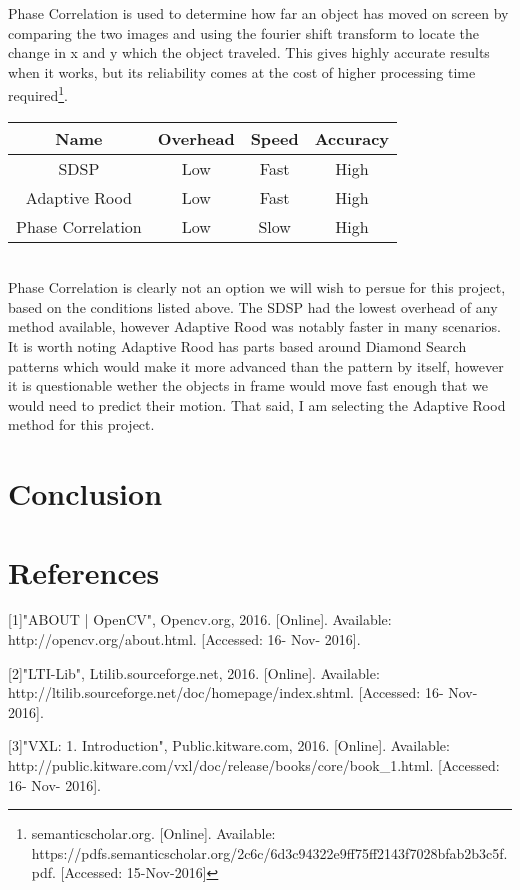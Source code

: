 \documentclass[letterpaper,10pt,onecolumn,draftclsnofoot]{IEEEtran}
\begin{document}
Phase Correlation is used to determine how far an object has moved on screen by comparing the two images and using the fourier shift transform to locate the change in x and y which the object traveled.  This gives highly accurate results when it works, but its reliability  comes at the cost of higher processing time required\footnote{semanticscholar.org. [Online]. Available: https://pdfs.semanticscholar.org/2c6c/6d3c94322e9ff75ff2143f7028bfab2b3c5f.pdf. [Accessed: 15-Nov-2016] }. \\

\begin{tabular}{|c|c|c|c|}
  \hline
  \textbf{Name} & \textbf{Overhead} & \textbf{Speed} & \textbf{Accuracy} \\
  \hline
  SDSP & Low & Fast & High \\ 
  \hline
  Adaptive Rood & Low & Fast & High  \\ 
  \hline
  Phase Correlation & Low & Slow & High \\ 
  \hline
\end{tabular} \\

Phase Correlation is clearly not an option we will wish to persue for this project, based on the conditions listed above.  The SDSP had the lowest overhead of any method available, however Adaptive Rood was notably faster in many scenarios.  It is worth noting Adaptive Rood has parts based around Diamond Search patterns which would make it more advanced than the pattern by itself, however it is questionable wether the objects in frame would move fast enough that we would need to predict their motion.  That said, I am selecting the Adaptive Rood method for this project.

\newpage
\section{Conclusion}

\section{References}

[1]"ABOUT | OpenCV", Opencv.org, 2016. [Online]. Available: http://opencv.org/about.html. [Accessed: 16- Nov- 2016].

[2]"LTI-Lib", Ltilib.sourceforge.net, 2016. [Online]. Available: http://ltilib.sourceforge.net/doc/homepage/index.shtml. [Accessed: 16- Nov- 2016].

[3]"VXL: 1. Introduction", Public.kitware.com, 2016. [Online]. Available: http://public.kitware.com/vxl/doc/release/books/core/book\_1.html. [Accessed: 16- Nov- 2016].
\end{document}
